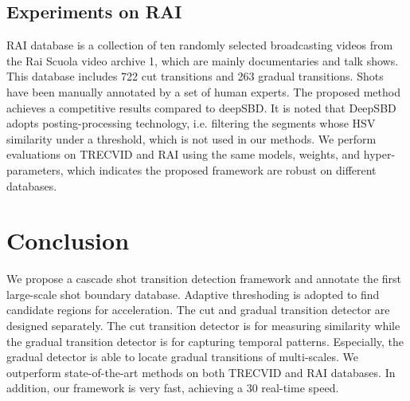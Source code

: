 \documentclass[runningheads]{llncs}
\begin{document}
\subsection{Experiments on RAI}
RAI database is a collection of ten randomly selected broadcasting videos from the Rai Scuola video archive 1, which are mainly documentaries and talk shows. This database includes 722 cut transitions and 263 gradual transitions. Shots have been manually annotated by a set of human experts. The proposed method achieves a competitive results compared to deepSBD. It is noted that DeepSBD adopts posting-processing technology, i.e. filtering the segments whose HSV similarity under a threshold, which is not used in our methods. We perform evaluations on TRECVID and RAI using the same models, weights, and hyper-parameters, which indicates the proposed framework are robust on different databases.

\section{Conclusion}
We propose a cascade shot transition detection framework and annotate the first large-scale shot boundary database. Adaptive threshoding is adopted to find candidate regions for acceleration. The cut and gradual transition detector are designed separately. The cut transition detector is for measuring similarity while the gradual transition detector is for capturing temporal patterns. Especially, the gradual detector is able to locate gradual transitions of multi-scales. We outperform state-of-the-art methods on both TRECVID and RAI databases. In addition, our framework is very fast, achieving a 30 real-time speed.



\end{document}
